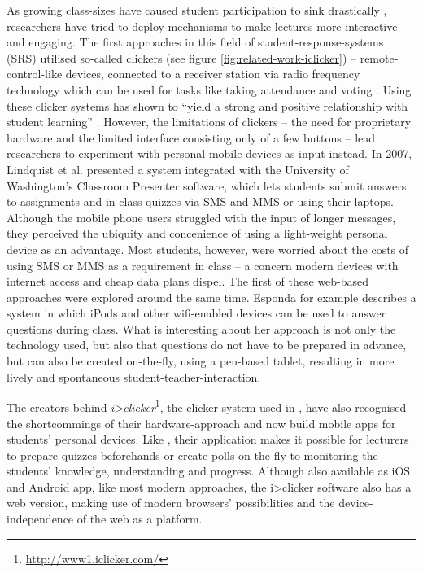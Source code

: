 As growing class-sizes have caused student participation to sink drastically \cite{Bry:Backstage}, researchers have tried to deploy mechanisms to make lectures more interactive and engaging. The first ap\-proa\-ches in this field of student-response-systems (SRS) utilised so-called clickers (see figure \ref{fig:related-work-iclicker}) -- remote-control-like devices, connected to a receiver station via radio frequency technology \cite{cuclickers:faq} which can be used for tasks like taking attendance and voting \cite{Chamillard:StudentResponseSystem}. Using these clicker systems has shown to ``yield a strong and positive relationship with student learning'' \cite{Chamillard:StudentResponseSystem}. However, the limitations of clickers -- the need for proprietary hardware and the limited interface consisting only of a few buttons -- lead researchers to experiment with personal mobile devices as input instead. In 2007, Lindquist et al. \cite{Lindquist:ExploringMobilePhonesActiveLearning} presented a system integrated with the University of Washington's Classroom Presenter software, which lets students submit answers to assignments and in-class quizzes via SMS and MMS or using their laptops. Although the mobile phone users struggled with the input of longer messages, they perceived the ubiquity and concenience of using a light-weight personal device as an advantage. Most students, however, were worried about the costs of using SMS or MMS as a requirement in class -- a concern modern devices with internet access and cheap data plans dispel. The first of these web-based approaches were explored around the same time. Esponda \cite{Esponda:ElectronicVotingOnTheFly} for example describes a system in which iPods and other wifi-enabled devices can be used to answer questions during class. What is interesting about her approach is not only the technology used, but also that questions do not have to be prepared in advance, but can also be created on-the-fly, using a pen-based tablet, resulting in more lively and spontaneous student-teacher-interaction.

The creators behind \emph{i>clicker}\footnote{\url{http://www1.iclicker.com/}}, the clicker system used in \cite{Chamillard:StudentResponseSystem}, have also recognised the shortcommings of their hardware-approach and now build mobile apps for students' personal devices. Like \cite{Esponda:ElectronicVotingOnTheFly}, their application makes it possible for lecturers to prepare quizzes beforehands or create polls on-the-fly to monitoring the students' knowledge, understanding and progress. Although also available as iOS and Android app, like most modern approaches, the i>clicker software also has a web version, making use of modern browsers' possibilities and the device-independence of the web as a platform.

